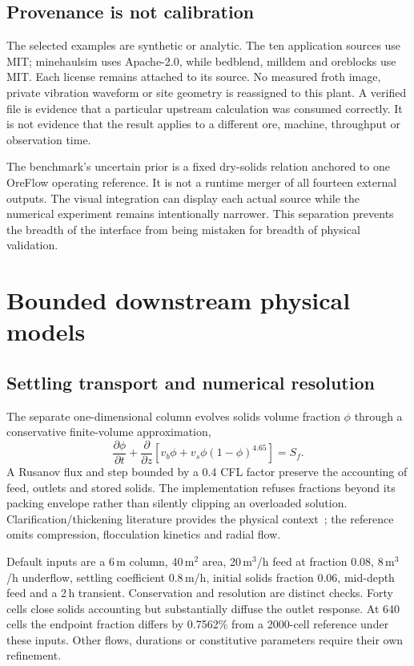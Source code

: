 \documentclass[11pt,a4paper]{article}
\begin{document}
\subsection{Provenance is not calibration}
The selected examples are synthetic or analytic. The ten application sources use MIT; minehaulsim uses Apache-2.0, while bedblend, milldem and oreblocks use MIT. Each license remains attached to its source. No measured froth image, private vibration waveform or site geometry is reassigned to this plant. A verified file is evidence that a particular upstream calculation was consumed correctly. It is not evidence that the result applies to a different ore, machine, throughput or observation time.

The benchmark's uncertain prior is a fixed dry-solids relation anchored to one OreFlow operating reference. It is not a runtime merger of all fourteen external outputs. The visual integration can display each actual source while the numerical experiment remains intentionally narrower. This separation prevents the breadth of the interface from being mistaken for breadth of physical validation.

\section{Bounded downstream physical models}
\subsection{Settling transport and numerical resolution}
The separate one-dimensional column evolves solids volume fraction $\phi$ through a conservative finite-volume approximation,
\begin{equation}
 \frac{\partial\phi}{\partial t}+\frac{\partial}{\partial z}
 \left[v_b\phi+v_s\phi(1-\phi)^{4.65}\right]=S_f.
\end{equation}
A Rusanov flux and step bounded by a 0.4 CFL factor preserve the accounting of feed, outlets and stored solids. The implementation refuses fractions beyond its packing envelope rather than silently clipping an overloaded solution. Clarification/thickening literature provides the physical context~\cite{takacs}; the reference omits compression, flocculation kinetics and radial flow.

Default inputs are a 6\,m column, 40\,m$^2$ area, 20\,m$^3$/h feed at fraction 0.08, 8\,m$^3$/h underflow, settling coefficient 0.8\,m/h, initial solids fraction 0.06, mid-depth feed and a 2\,h transient. Conservation and resolution are distinct checks. Forty cells close solids accounting but substantially diffuse the outlet response. At 640 cells the endpoint fraction differs by 0.7562\% from a 2000-cell reference under these inputs. Other flows, durations or constitutive parameters require their own refinement.
\end{document}
